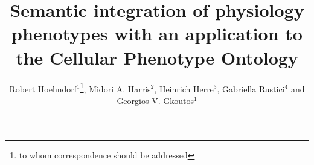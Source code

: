 \documentclass{bioinfo}
\begin{document}

\title[Physiology phenotypes]{Semantic integration of physiology
  phenotypes with an application to the Cellular Phenotype Ontology}

\author[Hoehndorf \textit{et~al}]{Robert Hoehndorf$^{1}$\footnote{to
    whom correspondence should be addressed}, Midori
  A. Harris$^2$, Heinrich Herre$^3$, Gabriella Rustici$^4$ and
  Georgios V. Gkoutos$^{1}$}

\address{$^{1}$Department of Genetics, University of Cambridge,
  Downing Street, Cambridge, Cambridge CB2 3EH, UK\\
  $^{2}$Department of Biochemistry; University of Cambridge, 80 Tennis
  Court Road, Cambridge CB2 1GA, UK\\
  $^{3}$Institute for Medical Informatics, Statistics and
  Epidemiology, University of Leipzig, Haertelstrasse 16-18, 04107
  Leipzig, Germany\\
  $^{4}$European Bioinformatics Institute, Wellcome Trust Genome
  Campus, Hinxton, Cambridge, Cambridge CB10 1SD, UK}



\maketitle
 
\end{document}
